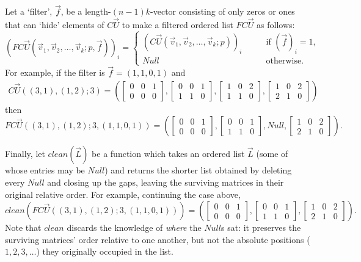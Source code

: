 \documentclass{article}
\begin{document}
\label{def:FCU}Let a `filter', $\vec f$, be a length-$(n-1)k$-vector consisting of only zeros or ones that can `hide' elements of $C\vec U$ to make a filtered ordered list
$FC\vec U$ as follows:
$$
   \left( FC\vec U(\vec v_1, \vec v_2, \ldots, \vec v_k; p,\vec f) \right)_i =
    \begin{cases}
    \left( C\vec U(\vec v_1, \vec v_2, \ldots, \vec v_k; p) \right)_i \qquad & \text{if $(\vec f)_i = 1$},\\
    Null & \text{otherwise.}
    \end{cases}
$$
For example, if the filter is $\vec f=(1,1,0,1)$ and 
\begin{align}C\vec U((3,1), (1,2); 3) = \left(
\begin{bmatrix}
0 & 0 & 1 \\
0 & 0 & 0
\end{bmatrix},
\begin{bmatrix}
0 & 0 & 1 \\
1 & 1 & 0 
\end{bmatrix},
\begin{bmatrix}
1 & 0 & 2 \\
1 & 1 & 0
\end{bmatrix},
\begin{bmatrix}
1 & 0 & 2 \\
2 & 1 & 0
\end{bmatrix}
\right)\label{eq:cu3example}
\end{align}
then
$$FC\vec U((3,1), (1,2); 3,(1,1,0,1))
=
\left(
\begin{bmatrix}
0 & 0 & 1 \\
0 & 0 & 0
\end{bmatrix},
\begin{bmatrix}
0 & 0 & 1 \\
1 & 1 & 0 
\end{bmatrix},
Null,
\begin{bmatrix}
1 & 0 & 2 \\
2 & 1 & 0
\end{bmatrix}
\right).
$$

\label{def:clean}Finally, let $clean(\vec L)$ be a function which takes an ordered list $\vec L$ (some of whose entries may be $Null$) and returns the shorter list obtained by deleting every $Null$ and closing up the gaps, leaving the surviving matrices in their original relative order.
For example, continuing the case above,
$$
clean\left( FC\vec U((3,1), (1,2); 3,(1,1,0,1)) \right)
=
\left(
\begin{bmatrix}
0 & 0 & 1 \\
0 & 0 & 0
\end{bmatrix},
\begin{bmatrix}
0 & 0 & 1 \\
1 & 1 & 0
\end{bmatrix},
\begin{bmatrix}
1 & 0 & 2 \\
2 & 1 & 0
\end{bmatrix}
\right).
$$
Note that $clean$ discards the knowledge of \emph{where} the $Null$s sat: it preserves the surviving matrices' order relative to one another, but not the absolute positions ($1,2,3,\ldots$) they originally occupied in the list.
\end{document}

